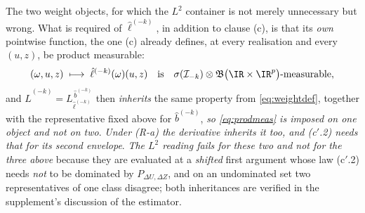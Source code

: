 \begin{definition}
\begin{enumerate}
\begin{enumerate}
The two weight objects, for which the $L^{2}$ container is not merely unnecessary but wrong. What is
required of $\hat\ell^{(-k)}$, in addition to clause \textup{(c)}, is that its \emph{own} pointwise
function, the one \textup{(c)} already defines, at every realisation and every $(u,z)$, be product
measurable:
\begin{equation}\label{eq:prodmeas}
(\omega,u,z)\;\longmapsto\;\hat\ell^{(-k)}(\omega)(u,z)
\quad\text{is}\quad
\sigma(\mathcal I_{-k})\otimes\mathfrak B\big(\IR\times\IR^{p}\big)\text{-measurable} ,
\end{equation}
and $\hat L^{(-k)}=L^{\,\hat b^{(-k)}}_{\hat\ell^{(-k)}}$ then \emph{inherits} the same property from
\eqref{eq:weightdef}, together with the representative fixed above for $\hat b^{(-k)}$, \emph{so
\eqref{eq:prodmeas} is imposed on one object and not on two}. \emph{Under (R-a) the derivative inherits it too, and \textup{(c$'$.2)} needs that for its
second envelope}. \emph{The $L^{2}$ reading fails for these two and not for the three above} because they are
evaluated at a \emph{shifted} first argument whose law \textup{(c$'$.2)} needs \emph{not} to be dominated by
$P_{\Delta U,\Delta Z}$, and on an undominated set two representatives of one class disagree; both
inheritances are verified in the supplement's discussion of the estimator.


\end{enumerate}
\end{enumerate}
\end{definition}
